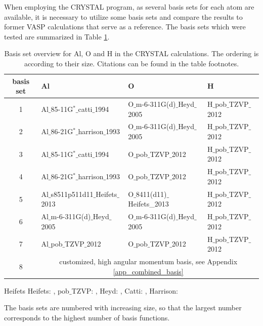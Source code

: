 \documentclass[11pt,DIV=13,BCOR=5mm,a4paper,headinclude]{scrbook}
\begin{document}
When employing the CRYSTAL program, as several basis sets for each atom are available, it is necessary to utilize some basis sets and compare the results to former VASP calculations that serve as a reference.
The basis sets which were tested are summarized in Table \ref{tab:basissets}.
\begin{table}[!h]
  \centering
   \caption{Basis set overview for Al, O and H in the CRYSTAL calculations.
   The ordering is according to their size.
   Citations can be found in the table footnotes.}
  \begin{tabular}{c|lll}
  \toprule
  basis set & Al & O & H \\\midrule
   1&Al$\_$85-11G$^\ast\_$catti$\_$1994 &O$\_$m-6-311G(d)$\_$Heyd$\_$2005 & H$\_$pob$\_$TZVP$\_$2012\\
   2&Al$\_$86-21G$^\ast\_$harrison$\_$1993 &O$\_$m-6-311G(d)$\_$Heyd$\_$2005 & H$\_$pob$\_$TZVP$\_$2012\\
   3&Al$\_$85-11G$^\ast\_$catti$\_$1994 &O$\_$pob$\_$TZVP$\_$2012 & H$\_$pob$\_$TZVP$\_$2012\\
   4&Al$\_$86-21G$^\ast\_$harrison$\_$1993 &O$\_$pob$\_$TZVP$\_$2012 & H$\_$pob$\_$TZVP$\_$2012\\
   5&Al$\_$s8511p511d11$\_$Heifets$\_$2013 & O$\_$8411(d11)$\_$Heifets\_2013&H$\_$pob$\_$TZVP$\_$2012 \\
   6&Al$\_$m-6-311G(d)$\_$Heyd$\_$2005 &O$\_$m-6-311G(d)$\_$Heyd$\_$2005 & H$\_$pob$\_$TZVP$\_$2012\\
   7&Al$\_$pob$\_$TZVP$\_$2012 &O$\_$pob$\_$TZVP$\_$2012 & H$\_$pob$\_$TZVP$\_$2012\\
   8& \multicolumn{3}{c}{customized, high angular momentum basis, see Appendix \ref{app_combined_basis}} \\\bottomrule
  \end{tabular}
  \begin{tablenotes}
 \footnotesize
\item[Heifets] Heifets: \cite{heifets}, pob$\_$TZVP: \cite{pobTZVP}, Heyd: \cite{heyd1,heyd2}, Catti: \cite{catti}, Harrison: \cite{harrison1,harrison2}
\end{tablenotes}
  \label{tab:basissets}
\end{table}
The basis sets are numbered with increasing size, so that the largest number corresponds to the highest number of basis functions.
\end{document}
